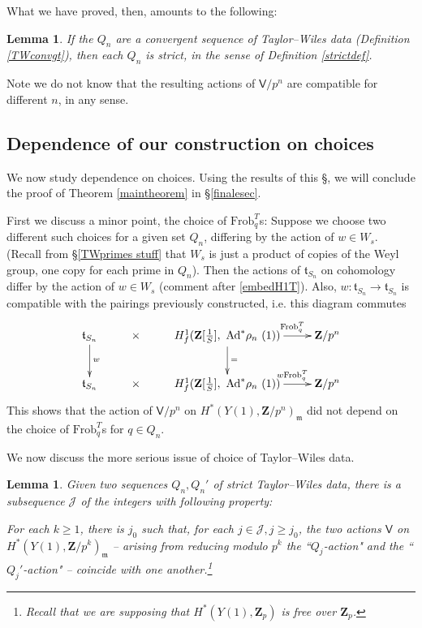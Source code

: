\documentclass[10pt]{amsart}
\newcommand{\Z}{\mathbf{Z}}
\newcommand{\Ad}{\mathrm{Ad}}
\newcommand{\Frob}{\mathrm{Frob}}
\newcommand{\Vinf}{\mathsf{V}}
\newtheorem{lemma}[subsection]{Lemma}
\theoremstyle{remark}
\begin{document}
What we have proved, then, amounts to the following:
\begin{lemma}  \label{Convergent implies strict} 
If the $Q_n$ are a convergent sequence of Taylor--Wiles data (Definition \ref{TWconvgt}), then 
each $Q_n$ is strict, in the sense of Definition \ref{strictdef}. 
\end{lemma}


Note we do not know that the resulting actions  of $\Vinf/p^n$ are compatible for different $n$, in any sense. 
 

 
 
 
\subsection{Dependence of our construction on  choices} \label{obstructions}
We now study dependence on choices.  Using the results of this \S, we will conclude the proof of  Theorem  \ref{maintheorem}
in \S \ref{finalesec}. 

First we discuss a minor point,  the choice of $\Frob_q^T$s: 
Suppose we choose two different such choices for a given set $Q_n$,   differing by the action of $w \in W_s$.  (Recall from 
\S \ref{TWprimes stuff} that $W_s$ is just a product of copies of the Weyl group, one copy for each prime in $Q_n$). 
Then  the actions of $\mathfrak{t}_{S_n} $ on cohomology differ
by the action of $w \in W_s$ (comment after \eqref{embedH1T}). 
%
%
%
Also, $w : \mathfrak{t}_{S_n} \rightarrow \mathfrak{t}_{S_n}$  is compatible with the pairings previously constructed, i.e. 
this diagram commutes
 \begin{equation} \xymatrix{
\mathfrak{t}_{S_n}  \ar[d]^{w} & \times  & H^1_f(\Z[\frac{1}{S}], \ \Ad^* \rho_n \ (1))  \ar[d]^{=}   \ar[r]^{ \ \ \qquad \Frob_q^T}  & \Z/p^n  \\ 
\mathfrak{t}_{S_n} & \times  & H^1_f(\Z[\frac{1}{S}], \ \Ad^* \rho_n \ (1))    \ar[r]^{\ \ \qquad w \Frob_q^T} & \Z/p^n  \\ 
  } \end{equation}
 This shows that the action of $\Vinf/p^n$ on $H^*(Y(1), \Z/p^n)_{\mathfrak{m}}$
 did not depend on the choice of $\Frob_q^T$s for $q \in Q_n$. 


We now discuss the more serious issue of choice of Taylor--Wiles data. 
 
 \begin{lemma}  \label{EqualityOfTwo}
Given  two sequences $Q_n, Q_n'$ of {\em strict} Taylor--Wiles data, 
there is a subsequence $\mathcal{J}$ of  the integers with following property:

For each $k \geq 1$,  there is $j_0$ such that, for  each $j \in \mathcal{J}, j \geq j_0$,  the  two actions $\Vinf$ on $H^*(Y(1),  \Z/p^{k})_{\mathfrak{m}}$
-- arising from reducing modulo $p^k$ the ``$Q_{j}$-action" and the ``$Q_{j}'$-action"  -- coincide with one another.\footnote{Recall that we are supposing that $H^*(Y(1), \Z_p)$ is
free over $\Z_p$.}  


\end{lemma}
\end{document}

